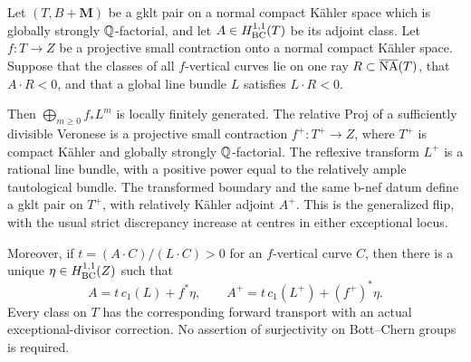\begin{proposition}
\label{repair:prop:detector-flip}
Let $(T,B+\mathbf M)$ be a gklt pair on a normal compact K\"ahler
space which is globally strongly $\mathbb Q$-factorial, and let $A\in H^{1,1}_{\mathrm{BC}}(T)$
be its adjoint class. Let $f:T\to Z$ be a projective small contraction
onto a normal compact K\"ahler space. Suppose that the classes of all
$f$-vertical curves lie on one ray $R\subset\overline{\mathrm{NA}}(T)$, that $A\cdot R<0$,
and that a global line bundle $L$ satisfies $L\cdot R<0$.

Then $\bigoplus_{m\geq0}f_*L^m$ is locally finitely generated. The
relative Proj of a sufficiently divisible Veronese is a projective
small contraction $f^+:T^+\to Z$, where $T^+$ is compact K\"ahler and
globally strongly $\mathbb Q$-factorial. The reflexive transform $L^+$ is a
rational line bundle, with a positive power equal to the relatively
ample tautological bundle. The transformed boundary and the same
b-nef datum define a gklt pair on $T^+$, with relatively K\"ahler
adjoint $A^+$. This is the generalized flip, with the usual
strict discrepancy increase at centres in either exceptional locus.

Moreover, if $t=(A\cdot C)/(L\cdot C)>0$ for an $f$-vertical curve $C$,
then there is a unique $\eta\in H^{1,1}_{\mathrm{BC}}(Z)$ such that
\[
 A=t\,c_1(L)+f^*\eta,\qquad
 A^+=t\,c_1(L^+)+(f^+)^*\eta.
\]
Every class on $T$ has the corresponding forward transport with an
actual exceptional-divisor correction. No assertion of surjectivity
on Bott--Chern groups is required.
\end{proposition}

